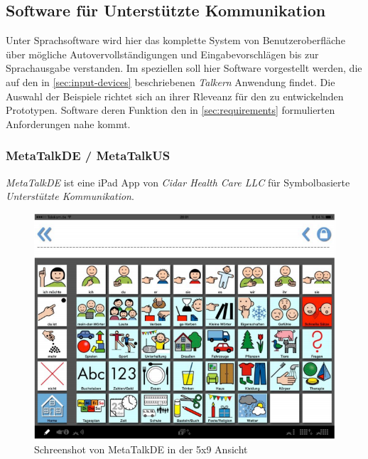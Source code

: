     \subsection{Software für Unterstützte Kommunikation}
    \label{sec:software-examples}
    
    	Unter Sprachsoftware wird hier das komplette System von Benutzeroberfläche über mögliche Autovervollständigungen und Eingabevorschlägen bis zur Sprachausgabe verstanden. Im speziellen soll hier Software vorgestellt werden, die auf den in \autoref{sec:input-devices} beschriebenen \emph{Talkern} Anwendung findet. Die Auswahl der Beispiele richtet sich an ihrer Rleveanz für den zu entwickelnden Prototypen. Software deren Funktion den in \autoref{sec:requirements} formulierten Anforderungen nahe kommt.
        
        \subsubsection*{MetaTalkDE / MetaTalkUS}
        	\emph{MetaTalkDE} ist eine iPad App von \emph{Cidar Health Care LLC} für Symbolbasierte \emph{Unterstützte Kommunikation}.
            
            \begin{figure}[H]
				\centering
				\includegraphics[width=.65\linewidth]{images/Metatalk.png}
                \caption{Schreenshot von MetaTalkDE in der 5x9 Ansicht
                	\parencite[S. 8]{cidar:metaTalkManual}
                }
				\label{fig:metatalk}
			\end{figure}
            
